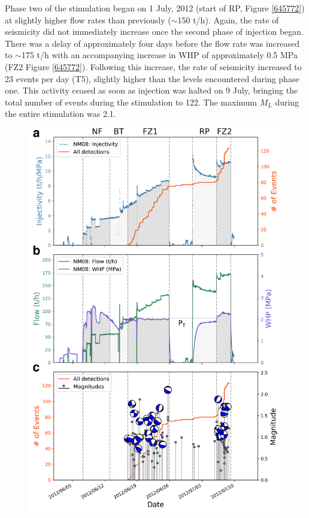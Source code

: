 Phase two of the stimulation began on 1 July, 2012 (start of RP, Figure \ref{645772}) at slightly higher flow rates than previously ($\sim$150 t/h). Again, the rate of seismicity did not immediately increase once the second phase of injection began. There was a delay of approximately four days before the flow rate was increased to $\sim$175 t/h with an accompanying increase in WHP of approximately 0.5 MPa (FZ2 Figure \ref{645772}). Following this increase, the rate of seismicity increased to 23 events per day (T5), slightly higher than the levels encountered during phase one. This activity ceased as soon as injection was halted on 9 July, bringing the total number of events during the stimulation to 122. The maximum $M_{L}$ during the entire stimulation was 2.1.

\begin{figure}[p]
\begin{center}
\includegraphics[width=0.84\columnwidth]{Chapter_3_Nga/figures/Multiplet_95_vs_flow_rate/Full_final_cat_flow_WHP_mags_FMs_diffusion_NM08_Stim_II_11-7_GrowClust_no_diffs_lines_gray_labels_12-5_original}

\end{center}
\end{figure}
